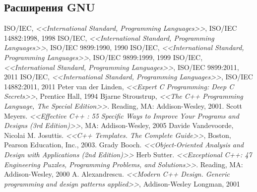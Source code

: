 \documentclass[a4paper,12pt,oneside]{article}
\begin{document}
\subsection{Расширения GNU}

\pagebreak
{}
\listoffigures

\pagebreak
{}
\begin{thebibliography}{99}
 ISO/IEC, \textit{<<International Standard, Programming Languages>>}, ISO/IEC 14882:1998, 1998
 ISO/IEC, \textit{<<International Standard, Programming Languages>>}, ISO/IEC 9899:1990, 1990
 ISO/IEC, \textit{<<International Standard, Programming Languages>>}, ISO/IEC 9899:1999, 1999
 ISO/IEC, \textit{<<International Standard, Programming Languages>>}, ISO/IEC 9899:2011, 2011
 ISO/IEC, \textit{<<International Standard, Programming Languages>>}, ISO/IEC 14882:2011, 2011
 Peter van der Linden, \textit{<<Expert C Programming: Deep C Secrets>>}, Prentice Hall, 1994
 Bjarne Stroustrup, \textit{<<The C++ Programming Language, The Special Edition>>}. Reading, MA: Addison-Wesley, 2001.
 Scott Meyers. \textit{<<Effective C++ : 55 Specific Ways to Improve Your Programs and Designs (3rd Edition)>>}, MA: Addison-Wesley, 2005
 Davide Vandevoorde, Nicolai M. Josuttis. \textit{<<C++ Templates. The Complete Guide>>}, Boston, Pearson Education, Inc., 2003.
 Grady Booch. \textit{<<Object-Oriented Analysis and Design with Applications (2nd Edition)>>}
 Herb Sutter. \textit{<<Exceptional C++: 47 Engineering Puzzles, Programming Problems, and Solutions>>}. Reading, MA: Addison-Wesley, 2000
 A. Alexandrescu. \textit{<<Modern C++ Design. Generic programming and design patterns applied>>}, Addison-Wesley Longman, 2001
\end{thebibliography}

\pagebreak
{}
\printindex
\end{document}
